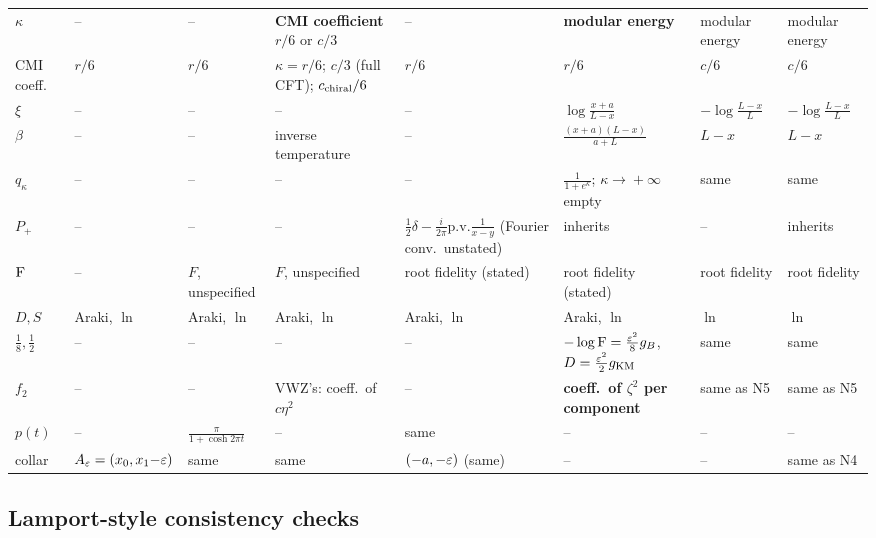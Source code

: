 \documentclass[11pt]{article}
\newcommand{\NIV}{N4}\newcommand{\NV}{N5}\newcommand{\NVI}{N6}\newcommand{\NVII}{N7}
\newcommand{\pv}{\mathrm{p.v.}}
\newcommand{\zz}{\zeta}
\begin{document}
\begin{center}
\begin{tabular}{@{}L{0.115\textwidth}L{0.105\textwidth}L{0.105\textwidth}L{0.105\textwidth}L{0.115\textwidth}L{0.135\textwidth}L{0.105\textwidth}L{0.115\textwidth}@{}}
$\kappa$ & -- & -- & \textbf{CMI coefficient} $r/6$ or $c/3$ & -- & \textbf{modular energy} & modular energy & modular energy\\
CMI coeff. & $r/6$ & $r/6$ & $\kappa=r/6$; $c/3$ (full CFT); $c_{\rm chiral}/6$ & $r/6$ & $r/6$ & $c/6$ & $c/6$\\
$\xi$ & -- & -- & -- & -- & $\log\frac{x+a}{L-x}$ & $-\log\frac{L-x}L$ & $-\log\frac{L-x}L$\\
$\beta$ & -- & -- & inverse temperature & -- & $\frac{(x+a)(L-x)}{a+L}$ & $L-x$ & $L-x$\\
$q_\kappa$ & -- & -- & -- & -- & $\frac1{1+e^\kappa}$; $\kappa\!\to\!+\infty$ empty & same & same\\
$P_+$ & -- & -- & -- & $\frac12\delta-\frac i{2\pi}\pv\frac1{x-y}$ (Fourier conv.\ unstated) & inherits & -- & inherits\\
$\operatorname{F}$ & -- & $F$, unspecified & $F$, unspecified & root fidelity (stated) & root fidelity (stated) & root fidelity & root fidelity\\
$D,S$ & Araki, $\ln$ & Araki, $\ln$ & Araki, $\ln$ & Araki, $\ln$ & Araki, $\ln$ & $\ln$ & $\ln$\\
$\frac18,\frac12$ & -- & -- & -- & -- & $-\log\operatorname{F}=\frac{\varepsilon^2}8g_B$, $D=\frac{\varepsilon^2}2g_{\rm KM}$ & same & same\\
$f_2$ & -- & -- & VWZ's: coeff.\ of $c\eta^2$ & -- & \textbf{coeff.\ of $\zz^2$ per component} & same as \NV & same as \NV\\
$p(t)$ & -- & $\frac\pi{1+\cosh2\pi t}$ & -- & same & -- & -- & --\\
collar & $A_\varepsilon=(x_0,x_1{-}\varepsilon)$ & same & same & $(-a,-\varepsilon)$ (same) & -- & -- & same as \NIV\\
\bottomrule
\end{tabular}
\end{center}

\subsection{Lamport-style consistency checks}
\end{document}
